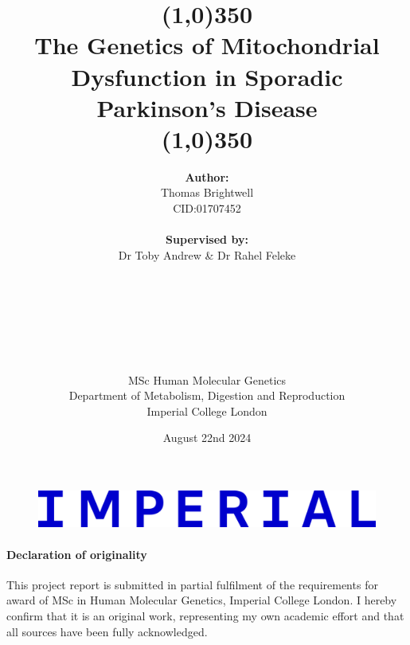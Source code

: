 \documentclass{article}
\title{\textbf{\line(1,0){350}
\\\huge{The Genetics of Mitochondrial Dysfunction in Sporadic Parkinson's Disease}
\\
\line(1,0){350}}}
\author{\textbf{Author:}
\\Thomas Brightwell
\\CID:01707452
\\
\\\textbf{Supervised by:}
\\Dr Toby Andrew & Dr Rahel Feleke
\\
\\
\\
\\
\\
\\
\\
\\MSc Human Molecular Genetics
\\Department of Metabolism, Digestion and Reproduction
\\Imperial College London
}
\date{August 22nd 2024}
\begin{document}
\begin{figure}
    \includegraphics[width=0.5\linewidth]{IMPERIAL_logo_RGB_Blue_2024.png}
\end{figure}
\maketitle
\newpage
\paragraph{Declaration of originality}
This project report is submitted in partial fulfilment of the requirements for award of MSc in Human Molecular Genetics, Imperial College London. I hereby confirm that it is an original work, representing my own academic effort and that all sources have been fully acknowledged.
\end{document}
